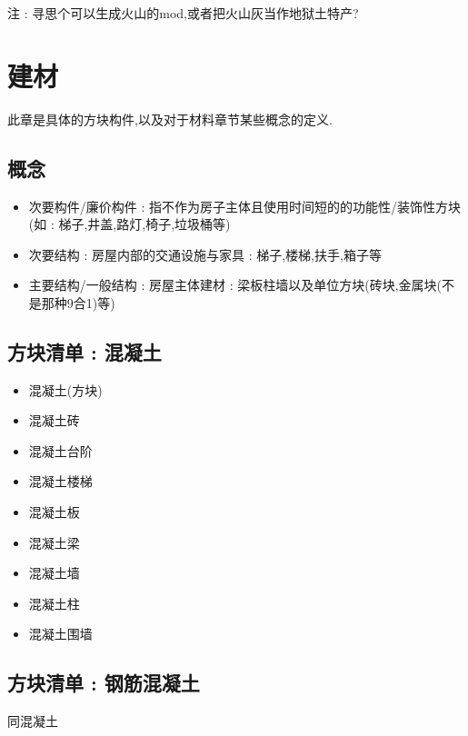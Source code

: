 {{{          注 : 寻思个可以生成火山的mod,或者把火山灰当作地狱土特产?
      }\label{cement}

  }
 }

\section{建材}{
  此章是具体的方块构件,以及对于材料章节某些概念的定义.

  \subsection{概念}{
      \begin{itemize}
          \item 次要构件/廉价构件 : 指不作为房子主体且使用时间短的的功能性/装饰性方块(如 : 梯子,井盖,路灯,椅子,垃圾桶等)
          \item 次要结构 : 房屋内部的交通设施与家具 : 梯子,楼梯,扶手,箱子等
          \item 主要结构/一般结构 : 房屋主体建材 : 梁板柱墙以及单位方块(砖块,金属块(不是那种9合1)等)
      \end{itemize}
  }

  \subsection{方块清单 : 混凝土}{
      \begin{itemize}
          \item 混凝土(方块)
          \item 混凝土砖
          \item 混凝土台阶
          \item 混凝土楼梯
          \item 混凝土板
          \item 混凝土梁
          \item 混凝土墙
          \item 混凝土柱
          \item 混凝土围墙
      \end{itemize}
  }

  \subsection{方块清单 : 钢筋混凝土}{
      同混凝土
  }

}
